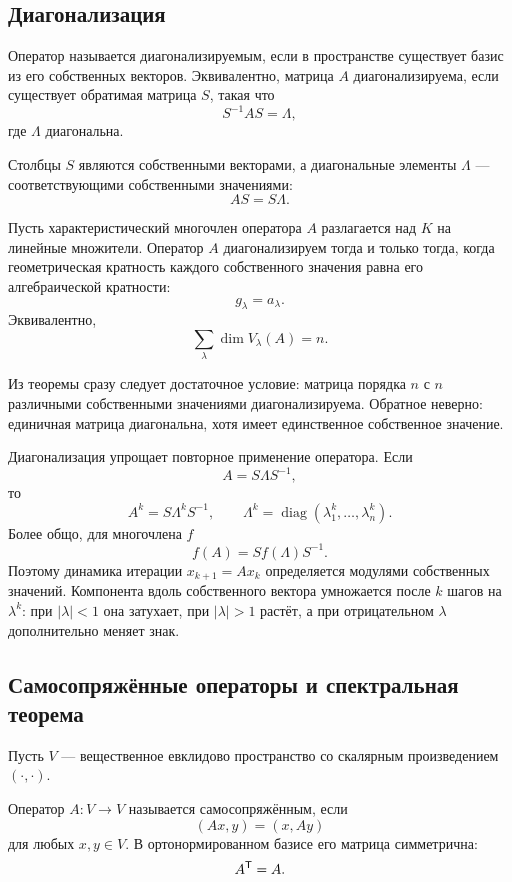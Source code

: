 \subsection{Диагонализация}

\begin{definition}
Оператор называется диагонализируемым, если в пространстве существует базис из его собственных векторов. Эквивалентно, матрица $A$ диагонализируема, если существует обратимая матрица $S$, такая что
\[
S^{-1}AS=\Lambda,
\]
где $\Lambda$ диагональна.
\end{definition}

Столбцы $S$ являются собственными векторами, а диагональные элементы $\Lambda$ --- соответствующими собственными значениями:
\[
AS=S\Lambda.
\]

\begin{theorem}
Пусть характеристический многочлен оператора $A$ разлагается над $K$ на линейные множители. Оператор $A$ диагонализируем тогда и только тогда, когда геометрическая кратность каждого собственного значения равна его алгебраической кратности:
\[
g_\lambda=a_\lambda.
\]
Эквивалентно,
\[
\sum_\lambda \dim V_\lambda(A)=n.
\]
\end{theorem}

Из теоремы сразу следует достаточное условие: матрица порядка $n$ с $n$ различными собственными значениями диагонализируема. Обратное неверно: единичная матрица диагональна, хотя имеет единственное собственное значение.

Диагонализация упрощает повторное применение оператора. Если
\[
A=S\Lambda S^{-1},
\]
то
\[
A^k=S\Lambda^kS^{-1},
\qquad
\Lambda^k=\operatorname{diag}(\lambda_1^k,\dots,\lambda_n^k).
\]
Более общо, для многочлена $f$
\[
f(A)=Sf(\Lambda)S^{-1}.
\]
Поэтому динамика итерации $x_{k+1}=Ax_k$ определяется модулями собственных значений. Компонента вдоль собственного вектора умножается после $k$ шагов на $\lambda^k$: при $|\lambda|<1$ она затухает, при $|\lambda|>1$ растёт, а при отрицательном $\lambda$ дополнительно меняет знак.

\subsection{Самосопряжённые операторы и спектральная теорема}

Пусть $V$ --- вещественное евклидово пространство со скалярным произведением $(\cdot,\cdot)$.

\begin{definition}
Оператор $A\colon V\to V$ называется самосопряжённым, если
\[
(Ax,y)=(x,Ay)
\]
для любых $x,y\in V$. В ортонормированном базисе его матрица симметрична:
\[
A^{\mathsf{T}}=A.
\]
\end{definition}

